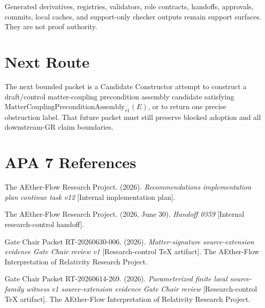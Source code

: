 \documentclass[11pt]{article}
\newcommand{\MCPA}{\mathrm{MatterCouplingPreconditionAssembly}_{v1}}
\begin{document}
Generated derivatives, registries, validators, role contracts, handoffs,
approvals, commits, local caches, and support-only checker outputs remain
support surfaces. They are not proof authority.

\section{Next Route}

The next bounded packet is a Candidate Constructor attempt to construct a
draft/control matter-coupling precondition assembly candidate satisfying
\(\MCPA(E)\), or to return one precise obstruction label. That future packet
must still preserve blocked adoption and all downstream-GR claim boundaries.

\section{APA 7 References}

The AEther-Flow Research Project. (2026). \emph{Recommendations
implementation plan continue task v12} [Internal implementation plan].

The AEther-Flow Research Project. (2026, June 30). \emph{Handoff 0359}
[Internal research-control handoff].

Gate Chair Packet RT-20260630-006. (2026). \emph{Matter-signature
source-extension evidence Gate Chair review v1} [Research-control TeX
artifact]. The AEther-Flow Interpretation of Relativity Research Project.

Gate Chair Packet RT-20260614-269. (2026). \emph{Parameterized finite local
source-family witness v1 source-extension evidence Gate Chair review}
[Research-control TeX artifact]. The AEther-Flow Interpretation of Relativity
Research Project.
\end{document}
